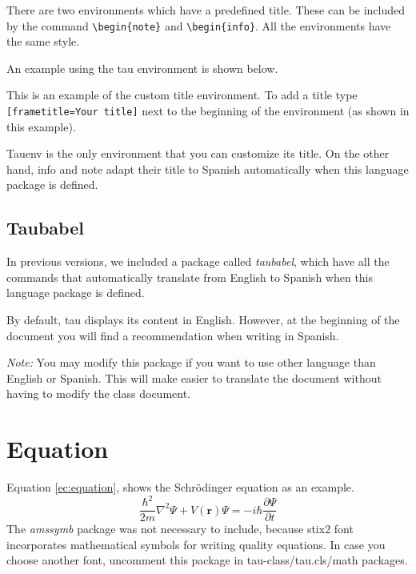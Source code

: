 \documentclass[9pt,a4paper,twocolumn,twoside]{tau-class/tau}
\begin{document}
        There are two environments which have a predefined title. These can be included by the command \verb|\begin{note}| and \verb|\begin{info}|. All the environments have the same style.
			
        An example using the tau environment is shown below.
		
    	\begin{tauenv}[frametitle=Environment with custom title]
            This is an example of the custom title environment. To add a title type \verb|[frametitle=Your title]| next to the beginning of the environment (as shown in this example).
    	\end{tauenv}
		
        Tauenv is the only environment that you can customize its title. On the other hand, info and note adapt their title to Spanish automatically when this language package is defined.
		
    \subsection{Taubabel}

        In previous versions, we included a package called \textit{taubabel}, which have all the commands that automatically translate from English to Spanish when this language package is defined. 
        
        By default, tau displays its content in English. However, at the beginning of the document you will find a recommendation when writing in Spanish. 
		
        \textit{Note:} You may modify this package if you want to use other language than English or Spanish. This will make easier to translate the document without having to modify the class document.
		
\section{Equation}

    Equation \ref{ec:equation}, shows the Schrödinger equation as an example. 
	\begin{equation} \label{ec:equation}
		\frac{\hbar^2}{2m}\nabla^2\Psi + V(\mathbf{r})\Psi = -i\hbar \frac{\partial\Psi}{\partial t}
	\end{equation} 
    The \textit{amssymb} package was not necessary to include, because stix2 font incorporates mathematical symbols for writing quality equations. In case you choose another font, uncomment this package in tau-class/tau.cls/math packages.
	
\end{document}
